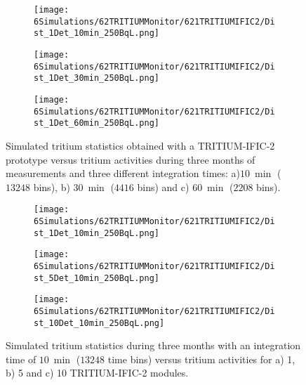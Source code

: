 \begin{figure}
\centering
    \begin{subfigure}[b]{0.6\textwidth}
    \centering
    \texttt{[image: 6Simulations/62TRITIUMMonitor/621TRITIUMIFIC2/Dist\_1Det\_10min\_250BqL.png]}  
    \caption{\label{subfig:1Det10min250BqLST}}
    \end{subfigure}
    \hfill
    \begin{subfigure}[b]{0.6\textwidth}
    \centering
    \texttt{[image: 6Simulations/62TRITIUMMonitor/621TRITIUMIFIC2/Dist\_1Det\_30min\_250BqL.png]}  
    \caption{\label{subfig:1Det30min250BqLST}}
    \end{subfigure}
    \hfill
    \begin{subfigure}[b]{0.6\textwidth}
    \centering
    \texttt{[image: 6Simulations/62TRITIUMMonitor/621TRITIUMIFIC2/Dist\_1Det\_60min\_250BqL.png]}  
    \caption{\label{subfig:1Det60min250BqLST}}
    \end{subfigure}
 \caption{Simulated tritium statistics obtained with a TRITIUM-IFIC-2 prototype versus tritium activities during three months of measurements and three different integration times: a)$10~\min$ ($13248$ bins), b) $30~\min$ ($4416$ bins) and c) $60~\min$ ($2208$ bins).}
 \label{fig:1Det250BqLseveralTimes}
\end{figure} 

\begin{figure}
\centering
    \begin{subfigure}[b]{0.6\textwidth}
    \centering
    \texttt{[image: 6Simulations/62TRITIUMMonitor/621TRITIUMIFIC2/Dist\_1Det\_10min\_250BqL.png]}  
    \caption{\label{subfig:1Det10min250BqLSD}}
    \end{subfigure}
    \hfill
    \begin{subfigure}[b]{0.6\textwidth}
    \centering
    \texttt{[image: 6Simulations/62TRITIUMMonitor/621TRITIUMIFIC2/Dist\_5Det\_10min\_250BqL.png]}  
    \caption{\label{subfig:5Det10min250BqLSD}}
    \end{subfigure}
    \hfill
    \begin{subfigure}[b]{0.6\textwidth}
    \centering
    \texttt{[image: 6Simulations/62TRITIUMMonitor/621TRITIUMIFIC2/Dist\_10Det\_10min\_250BqL.png]}  
    \caption{\label{subfig:10Det10min250BqLSD}}
    \end{subfigure}
 \caption{Simulated tritium statistics during three months with an integration time of $10~\min$ ($13248$ time bins) versus tritium activities for a) 1, b) 5 and c) 10 TRITIUM-IFIC-2 modules.}
 \label{fig:SeveralDet250BqL10min}
\end{figure}

